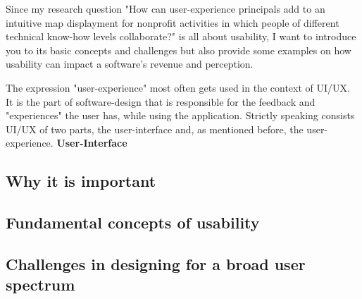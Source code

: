 \author{\daAuthorTwo}

Since my research question "How can user-experience principals add to an intuitive map displayment for nonprofit activities in which people of different technical know-how levels collaborate?" is all about usability, I want to introduce you to its basic concepts and challenges but also provide some examples on how usability can impact a software's revenue and perception.

\blankLine

The expression "user-experience" most often gets used in the context of UI/UX. It is the part of software-design that is responsible for the feedback and "experiences" the user has, while using the application. Strictly speaking consists UI/UX of two parts, the user-interface and, as mentioned before, the user-experience. \textbf{User-Interface}

\autocite{Paul:Usability101}


\subsection{Why it is important}

\subsection{Fundamental concepts of usability}

\subsection{Challenges in designing for a broad user spectrum}

\newpage